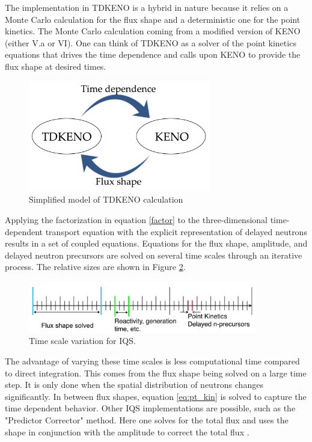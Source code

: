 \documentclass[11pt]{article}
\begin{document}
 The implementation in TDKENO is a hybrid in nature because it relies on a Monte Carlo calculation for the flux shape and a deterministic one for the point kinetics.  The Monte Carlo calculation coming from a modified version of KENO (either V.a or VI).  One can think of TDKENO as a solver of the point kinetics equations that drives the time dependence and calls upon KENO to provide the flux shape at desired times. 
 \begin{figure}[h]
     \centering
     \includegraphics[width=8cm]{figures/tdkeno_flow.pdf}
     \caption{Simplified model of TDKENO calculation}
     \label{fig:simpletdk}
 \end{figure}

Applying the factorization in equation \ref{factor} to the three-dimensional time-dependent transport equation with the explicit representation of delayed neutrons results in a set of coupled equations.  Equations for the flux shape, amplitude, and delayed neutron precursors are solved on several time scales through an iterative process. The relative sizes are shown in Figure \ref{fig:time_scale}. 

\begin{figure}[h]
    \centering
    \includegraphics[width=10cm]{figures/time_scale.pdf}
    \caption{Time scale variation for IQS.}
    \label{fig:time_scale}
\end{figure}

The advantage of varying these time scales is less computational time compared to direct integration.  This comes from the flux shape being solved on a large time step. It is only done when the spatial distribution of neutrons changes significantly.  In between flux shapes, equation \ref{eq:pt_kin} is solved to capture the time dependent behavior.  Other IQS implementations are possible, such as the "Predictor Corrector" method.  Here one solves for the total flux and uses the shape in conjunction with the amplitude to correct the total flux \cite{Dulla}.  
\end{document}
